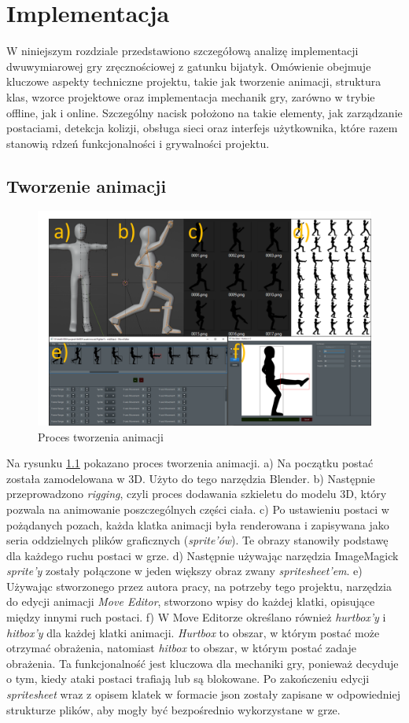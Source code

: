 \chapter{Implementacja}
W niniejszym rozdziale przedstawiono szczegółową analizę implementacji dwuwymiarowej gry zręcznościowej z gatunku bijatyk. Omówienie obejmuje kluczowe aspekty techniczne projektu, takie jak tworzenie animacji, struktura klas, wzorce projektowe oraz implementacja mechanik gry, zarówno w trybie offline, jak i online. Szczególny nacisk położono na takie elementy, jak zarządzanie postaciami, detekcja kolizji, obsługa sieci oraz interfejs użytkownika, które razem stanowią rdzeń funkcjonalności i grywalności projektu.
\section{Tworzenie animacji}
\begin{figure}
	\centering
		\includegraphics[width=0.64\linewidth]{rys03/animacja}
	\caption{Proces tworzenia animacji}
	\label{fig:animacja}
\end{figure}
Na rysunku \ref{fig:animacja} pokazano proces tworzenia animacji. a) Na początku postać została zamodelowana w 3D. Użyto do tego narzędzia Blender. b) Następnie przeprowadzono \emph{rigging}, czyli proces dodawania szkieletu do modelu 3D, który pozwala na animowanie poszczególnych części ciała. c) Po ustawieniu postaci w pożądanych pozach, każda klatka animacji była renderowana i zapisywana jako seria oddzielnych plików graficznych (\emph{sprite'ów}). Te obrazy stanowiły podstawę dla każdego ruchu postaci w grze. d) Następnie używając narzędzia ImageMagick \emph{sprite'y} zostały połączone w jeden większy obraz zwany \emph{spritesheet'em}. e) Używając stworzonego przez autora pracy, na potrzeby tego projektu, narzędzia do edycji animacji \emph{Move Editor}, stworzono wpisy do każdej klatki, opisujące między innymi ruch postaci. f) W Move Editorze określano również \emph{hurtbox'y} i \emph{hitbox'y} dla każdej klatki animacji. \emph{Hurtbox} to obszar, w którym postać może otrzymać obrażenia, natomiast \emph{hitbox} to obszar, w którym postać zadaje obrażenia. Ta funkcjonalność jest kluczowa dla mechaniki gry, ponieważ decyduje o tym, kiedy ataki postaci trafiają lub są blokowane. Po zakończeniu edycji \emph{spritesheet} wraz z opisem klatek w formacie json zostały zapisane w odpowiedniej strukturze plików, aby mogły być bezpośrednio wykorzystane w grze.
